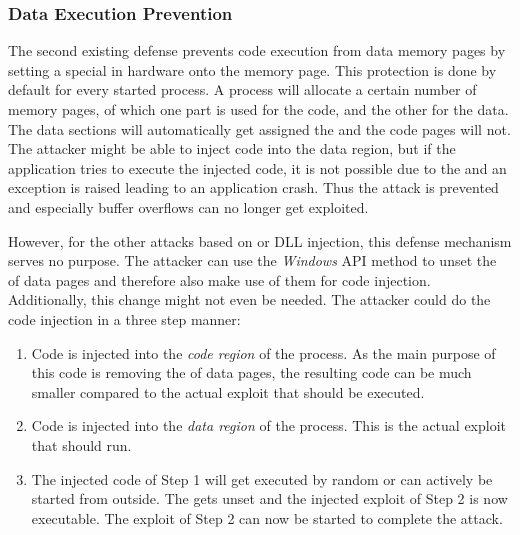 \subsubsection{Data Execution Prevention}
\label{sec:dep}
The second existing defense prevents code execution from data memory pages by setting a special  \cite{msdn_dep} in hardware onto the memory page. This protection is done by default for every started process. A process will allocate a certain number of memory pages, of which one part is used for the code, and the other for the data. The data sections will automatically get assigned the  and the code pages will not. The attacker might be able to inject code into the data region, but if the application tries to execute the injected code, it is not possible due to the  and an exception is raised leading to an application crash. Thus the attack is prevented and especially buffer overflows can no longer get exploited.

However, for the other attacks based on  or \gls{DLL} injection, this defense mechanism serves no purpose. The attacker can use the \emph{Windows} \gls{API} method  \cite{msdn_virtualprotect} to unset the  of data pages and therefore also make use of them for code injection. Additionally, this change might not even be needed. The attacker could do the code injection in a three step manner: 
\begin{enumerate}
\item Code is injected into the \emph{code region} of the process. As the main purpose of this code is removing the  of data pages, the resulting code can be much smaller compared to the actual exploit that should be executed.
\item Code is injected into the \emph{data region} of the process. This is the actual exploit that should run.
\item The injected code of Step 1 will get executed by random or can actively be started from outside. The  gets unset and the injected exploit of Step 2 is now executable. The exploit of Step 2 can now be started to complete the attack.
\end{enumerate}